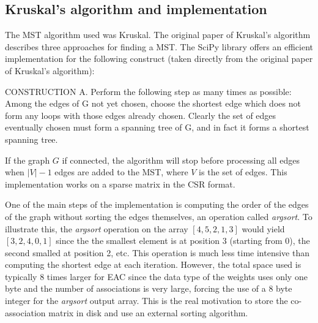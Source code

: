 \subsection{Kruskal's algorithm and implementation}

The MST algorithm used was Kruskal.
The original paper of Kruskal's \cite{kruskal1956shortest} algorithm describes three approaches for finding a MST.
The SciPy library offers an efficient implementation for the following construct (taken directly from the original paper of Kruskal's algorithm):
\begin{displayquote}
CONSTRUCTION A. Perform the following step as many times as possible: Among the edges of G not yet chosen, choose the shortest edge which does not form any loops with those edges already chosen. Clearly the set of edges eventually chosen must form a spanning tree of G, and in fact it forms a shortest spanning tree.
\end{displayquote}
If the graph $G$ if connected, the algorithm will stop before processing all edges when $|V| - 1$ edges are added to the MST, where $V$ is the set of edges.
This implementation works on a sparse matrix in the CSR format.

One of the main steps of the implementation is computing the order of the edges of the graph without sorting the edges themselves, an operation called \emph{argsort}.
To illustrate this, the \emph{argsort} operation on the array $ \left [  4 , 5 , 2 , 1, 3 \right ]$ would yield $ \left [  3 , 2 , 4, 0 , 1 \right ]$ since the the smallest element is at position 3 (starting from 0), the second smalled at position 2, etc.
This operation is much less time intensive than computing the shortest edge at each iteration.
However, the total space used is typically 8 times larger for EAC since the data type of the weights uses only one byte and the number of associations is very large, forcing the use of a 8 byte integer for the \emph{argsort} output array.
This is the real motivation to store the co-association matrix in disk and use an external sorting algorithm.

